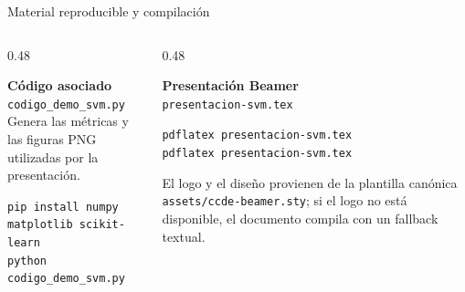 \begin{frame}{Material reproducible y compilación}
\small
\begin{columns}[T,onlytextwidth]
\begin{column}{0.48\textwidth}
\begin{ccdebox}
\textbf{Código asociado}\\[0.10cm]
\texttt{codigo\_demo\_svm.py}\\[0.10cm]
Genera las métricas y las figuras PNG utilizadas por la presentación.
\end{ccdebox}
\vspace{0.14cm}
\begin{keybox}
\texttt{pip install numpy matplotlib scikit-learn}\\[0.08cm]
\texttt{python codigo\_demo\_svm.py}
\end{keybox}
\end{column}
\begin{column}{0.48\textwidth}
\begin{ccdebox}
\textbf{Presentación Beamer}\\[0.10cm]
\texttt{presentacion-svm.tex}
\end{ccdebox}
\vspace{0.14cm}
\begin{keybox}
\texttt{pdflatex presentacion-svm.tex}\\[0.08cm]
\texttt{pdflatex presentacion-svm.tex}
\end{keybox}
\vspace{0.14cm}
\begin{ccdebox}
\footnotesize
El logo y el diseño provienen de la plantilla canónica \texttt{assets/ccde-beamer.sty}; si el logo no está disponible, el documento compila con un fallback textual.
\end{ccdebox}
\end{column}
\end{columns}
\end{frame}
